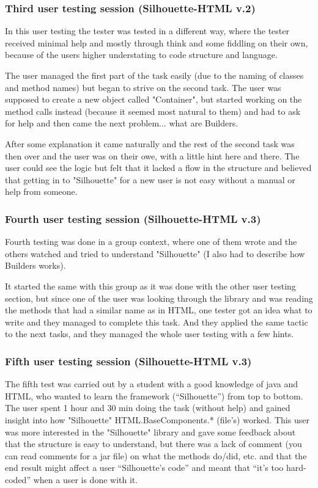 \documentclass[12pt]{article}
\begin{document}
        \subsubsection{Third user testing session (Silhouette-HTML v.2)}
        In this user testing the tester was tested in a different way, where the tester received minimal help and mostly through think and some fiddling on their own, because of the users higher understating to code structure and language.

        The user managed the first part of the task easily (due to the naming of classes and method names) but began to strive on the second task. The user was supposed to create a new object called "Container", but started working on the method calls instead (because it seemed most natural to them) and had to ask for help and then came the next problem... what are Builders.

        After some explanation it came naturally and the rest of the second task was then over and the user was on their owe, with a little hint here and there. The user could see the logic but felt that it lacked a flow in the structure and believed that getting in to "Silhouette" for a new user is not easy without a manual or help from someone.
        
        \subsubsection{Fourth user testing session (Silhouette-HTML v.3)}
        Fourth testing was done in a group context, where one of them wrote and the others watched and tried to understand "Silhouette" (I also had to describe how Builders works).

        It started the same with this group as it was done with the other user testing section, but since one of the user was looking through the library and was reading the methods that had a similar name as in HTML, one tester got an idea what to write and they managed to complete this task. And they applied the same tactic to the next tasks, and they managed the whole user testing with a few hints. 

        \subsubsection{Fifth user testing session (Silhouette-HTML v.3)}
        The fifth test was carried out by a student with a good knowledge of java and HTML, who wanted to learn the framework (“Silhouette”) from top to bottom. The user spent 1 hour and 30 min doing the task (without help) and gained insight into how "Silhouette" HTML.BaseComponents.* (file's) worked. This user was more interested in the "Silhouette" library and gave some feedback about that the structure is easy to understand, but there was a lack of comment (you can read comments for a jar file) on what the methods do/did, etc. and that the end result might affect a user “Silhouette’s code” and meant that “it’s too hard-coded” when a user is done with it.
\end{document}
